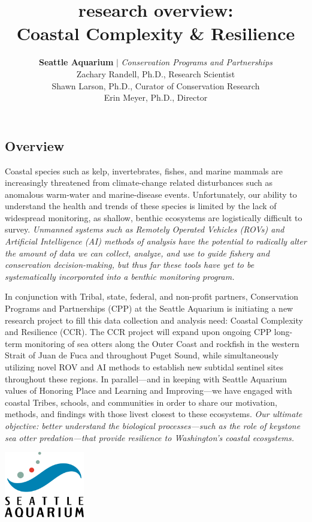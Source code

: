 \documentclass[11pt]{article}
\title{
research overview:
\\
Coastal Complexity \& Resilience 
\\
}
\author{
\Large{
\textbf{Seattle Aquarium} 
$\vert$ 
\textit{Conservation Programs and Partnerships}
}
\\
\large{
Zachary Randell, Ph.D., Research Scientist
\\
Shawn Larson, Ph.D., Curator of Conservation Research
\\
Erin Meyer, Ph.D., Director
}
\\
\vspace{10pt}
}
\begin{document}
\begin{titlepage}
\maketitle
\thispagestyle{empty}
\vfill

\section{Overview}
\label{Overview}
Coastal species such as kelp, invertebrates, fishes, and marine mammals 
are increasingly threatened from climate-change related disturbances 
such as anomalous warm-water and marine-disease events. 
Unfortunately, our ability to understand the health and trends of these 
species is limited by the lack of widespread monitoring, as shallow, 
benthic ecosystems are logistically difficult to survey.   
\textit{Unmanned systems such as Remotely Operated Vehicles (ROVs) and 
Artificial Intelligence (AI) methods of analysis have the potential to 
radically alter the amount of data we can collect, analyze, and use to 
guide fishery and conservation decision-making, but thus far these 
tools have yet to be systematically incorporated into a benthic 
monitoring program.} 

In conjunction with Tribal, state, federal, and non-profit partners, Conservation Programs and Partnerships (CPP) at the Seattle Aquarium is initiating a new research project to fill this data collection and analysis need: Coastal Complexity and Resilience (CCR).
The CCR project will expand upon ongoing CPP long-term monitoring of 
sea otters along the Outer Coast and rockfish in the western Strait of 
Juan de Fuca and throughout Puget Sound, while simultaneously utilizing 
novel ROV and AI methods to establish new subtidal sentinel sites 
throughout these regions. 
In parallel---and in keeping with Seattle Aquarium values of Honoring 
Place and Learning and Improving---we have engaged with coastal Tribes, 
schools, and communities in order to share our motivation, methods, and 
findings with those livest closest to these ecosystems. 
\textit{Our ultimate objective: better understand the biological 
processes---such as the role of keystone sea otter predation---that 
provide resilience to Washington's coastal ecosystems.}

\vspace{20pt}
\centering
\includegraphics[width=3.5cm]{logo.jpg}
\\
\end{titlepage}
\end{document}
